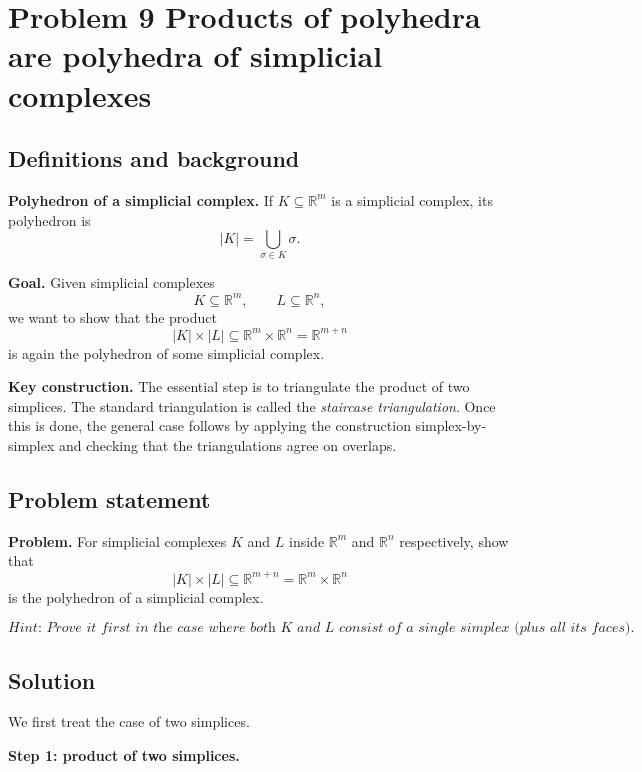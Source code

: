 \documentclass[12pt,a4paper]{article}
\theoremstyle{notespace}
\begin{document}
\bigskip

\section{Problem 9 Products of polyhedra are polyhedra of simplicial complexes}

\subsection{Definitions and background}

\textbf{Polyhedron of a simplicial complex.}
If \(K\subseteq \mathbb R^m\) is a simplicial complex, its polyhedron is
\[
|K|=\bigcup_{\sigma\in K}\sigma.
\]

\medskip

\textbf{Goal.}
Given simplicial complexes
\[
K\subseteq \mathbb R^m,
\qquad
L\subseteq \mathbb R^n,
\]
we want to show that the product
\[
|K|\times |L| \subseteq \mathbb R^m\times \mathbb R^n=\mathbb R^{m+n}
\]
is again the polyhedron of some simplicial complex.

\medskip

\textbf{Key construction.}
The essential step is to triangulate the product of two simplices. The standard triangulation is called the \emph{staircase triangulation}. Once this is done, the general case follows by applying the construction simplex-by-simplex and checking that the triangulations agree on overlaps.

\subsection{Problem statement}

\textbf{Problem.}
For simplicial complexes \(K\) and \(L\) inside \(\mathbb R^m\) and \(\mathbb R^n\) respectively, show that
\[
|K|\times |L| \subseteq \mathbb R^{m+n}=\mathbb R^m\times \mathbb R^n
\]
is the polyhedron of a simplicial complex.

\[
\textit{Hint: Prove it first in the case where both \(K\) and \(L\) consist of a single simplex (plus all its faces).}
\]

\subsection{Solution}

We first treat the case of two simplices.

\medskip

\textbf{Step 1: product of two simplices.}
\end{document}
